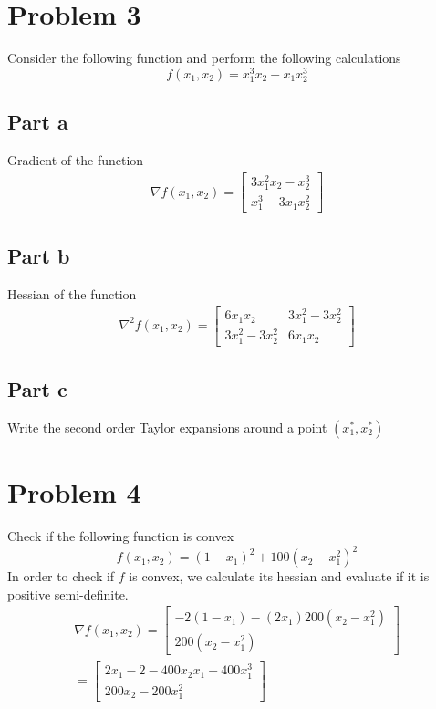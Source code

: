 \documentclass[11pt]{article}
\begin{document}
\section{Problem 3}
Consider the following function and perform the following calculations
\begin{equation*}
    f(x_1, x_2) = x_1^3 x_2 - x_1 x_2^3
\end{equation*}

\subsection{Part a}
Gradient of the function
\begin{align*}
    \nabla f(x_1, x_2) = 
  \begin{bmatrix}
     3x_1^2 x_2 - x_2^3 \\
     x_1^3 - 3x_1 x_2^2
  \end{bmatrix}
\end{align*}

\subsection{Part b}
Hessian of the function
\begin{align*}
    \nabla^2 f(x_1, x_2) = 
  \begin{bmatrix}
     6x_1 x_2 & 3x_1^2 - 3x_2^2 \\
     3x_1^2 - 3x_2^2 &  6 x_1 x_2
  \end{bmatrix}
\end{align*}

\subsection{Part c}
Write the second order Taylor expansions around a point $(x_1^*, x_2^*)$

\section{Problem 4}
Check if the following function is convex
\begin{equation*}
  f(x_1, x_2) = (1 - x_1)^2 + 100(x_2 - x_1^2)^2
\end{equation*}
In order to check if $f$ is convex, we calculate its hessian and evaluate if it is positive semi-definite.
\begin{align*}
  \nabla f(x_1, x_2) = 
  \begin{bmatrix}
    -2(1-x_1) - (2x_1) 200(x_2 - x_1^2) \\
    200(x_2 - x_1^2)
  \end{bmatrix}
  \\
  = 
  \begin{bmatrix}
    2x_1-2 - 400x_2 x_1 + 400x_1^3 \\
    200x_2 - 200x_1^2
  \end{bmatrix}
\end{align*}
\end{document}
